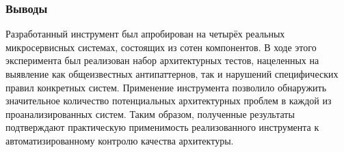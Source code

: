 \subsubsection{Выводы}

Разработанный инструмент был апробирован на четырёх реальных микросервисных системах, состоящих из сотен компонентов. В ходе этого эксперимента был реализован набор архитектурных тестов, нацеленных на выявление как общеизвестных антипаттернов, так и нарушений специфических правил конкретных систем. Применение инструмента позволило обнаружить значительное количество потенциальных архитектурных проблем в каждой из проанализированных систем. Таким образом, полученные результаты подтверждают практическую применимость реализованного инструмента к автоматизированному контролю качества архитектуры.
